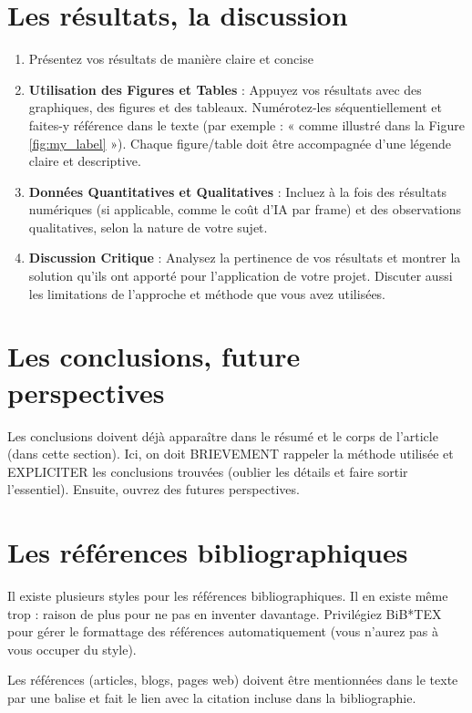\documentclass{rapportcs}
\begin{document}
    \section{Les résultats, la discussion}
    \begin{enumerate}
        \item Présentez vos résultats de manière claire et concise
        \item \textbf{Utilisation des Figures et Tables} : Appuyez vos résultats avec des graphiques, des figures et des tableaux. Numérotez-les séquentiellement et faites-y référence dans le texte (par exemple : « comme illustré dans la Figure \ref{fig:my_label} »). Chaque figure/table doit être accompagnée d’une légende claire et descriptive.
        \item \textbf{Données Quantitatives et Qualitatives} : Incluez à la fois des résultats numériques (si applicable, comme le coût d'IA par frame) et des observations qualitatives, selon la nature de votre sujet.

        \item \textbf{Discussion Critique} : Analysez la pertinence de vos résultats et montrer la solution qu'ils ont apporté pour l'application de votre projet. Discuter aussi les limitations de l'approche et méthode que vous avez utilisées.

    \end{enumerate}



    \section{Les conclusions, future perspectives}
    Les conclusions doivent déjà apparaître dans le résumé et le corps de l’article (dans cette section). Ici, on doit BRIEVEMENT rappeler la méthode utilisée et EXPLICITER les conclusions trouvées (oublier les détails et faire sortir l'essentiel). Ensuite, ouvrez des futures perspectives.


    \section{Les références bibliographiques}
    Il existe plusieurs styles pour les références bibliographiques. Il en existe même trop : raison de plus pour ne pas en inventer davantage.
    Privilégiez BiB*TEX pour gérer le formattage des références automatiquement (vous n’aurez pas à vous occuper du style).

    Les références (articles, blogs, pages web) doivent être mentionnées dans le texte par une balise \cite{Addoum2021} \cite{Addoum2021-bis} et fait le lien avec la citation incluse dans la bibliographie.
\end{document}
